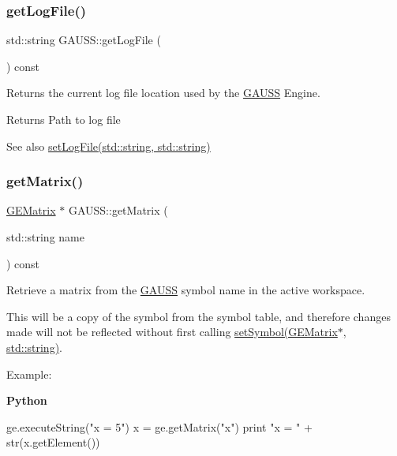 \subsubsection{\texorpdfstring{get\+Log\+File()}{getLogFile()}}
{\footnotesize\ttfamily std\+::string G\+A\+U\+S\+S\+::get\+Log\+File (\begin{DoxyParamCaption}{ }\end{DoxyParamCaption}) const}



Returns the current log file location used by the \hyperlink{class_g_a_u_s_s}{G\+A\+U\+SS} Engine. 

\begin{DoxyReturn}{Returns}
Path to log file
\end{DoxyReturn}
\begin{DoxySeeAlso}{See also}
\hyperlink{class_g_a_u_s_s_aeec13d5fa3abe9e9b7836cee87edf5b8}{set\+Log\+File(std\+::string, std\+::string)} 
\end{DoxySeeAlso}
\mbox{\label{class_g_a_u_s_s_a6bdba33e9ed8d7925a4d3578a64e8abb}} 
\subsubsection{\texorpdfstring{get\+Matrix()}{getMatrix()}\hspace{0.1cm}{\footnotesize\ttfamily [1/2]}}
{\footnotesize\ttfamily \hyperlink{class_g_e_matrix}{G\+E\+Matrix} $\ast$ G\+A\+U\+S\+S\+::get\+Matrix (\begin{DoxyParamCaption}\item[{std\+::string}]{name }\end{DoxyParamCaption}) const}



Retrieve a matrix from the \hyperlink{class_g_a_u_s_s}{G\+A\+U\+SS} symbol name in the active workspace. 

This will be a copy of the symbol from the symbol table, and therefore changes made will not be reflected without first calling \hyperlink{class_g_a_u_s_s_ab51cbcd5a66ba3355f52bf10bf31f7e3}{set\+Symbol(\+G\+E\+Matrix$\ast$, std\+::string)}.

Example\+:

{\bfseries Python} 
\begin{DoxyCode}
ge.executeString(\textcolor{stringliteral}{"x = 5"})
x = ge.getMatrix(\textcolor{stringliteral}{"x"})
\textcolor{keywordflow}{print} \textcolor{stringliteral}{"x = "} + str(x.getElement())
\end{DoxyCode}



